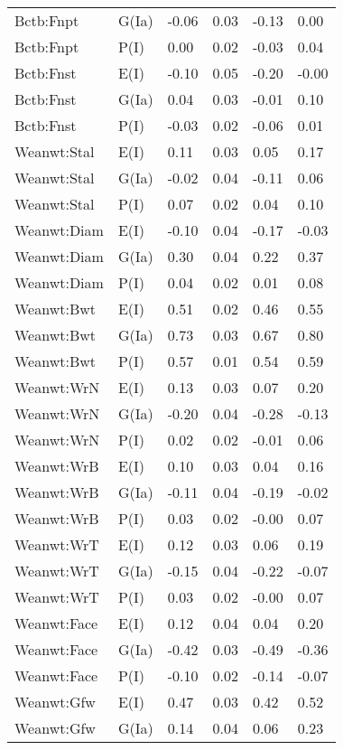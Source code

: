 \begin{center}
\begin{longtable}{|p{1.1in}|p{0.7in}|p{0.7in}|p{0.6in}|p{0.6in}|p{0.6in}|}
  Bctb:Fnpt & G(Ia) & -0.06 & 0.03 & -0.13 & 0.00 \\ 
  Bctb:Fnpt & P(I) & 0.00 & 0.02 & -0.03 & 0.04 \\ 
  Bctb:Fnst & E(I) & -0.10 & 0.05 & -0.20 & -0.00 \\ 
  Bctb:Fnst & G(Ia) & 0.04 & 0.03 & -0.01 & 0.10 \\ 
  Bctb:Fnst & P(I) & -0.03 & 0.02 & -0.06 & 0.01 \\ 
  Weanwt:Stal & E(I) & 0.11 & 0.03 & 0.05 & 0.17 \\ 
  Weanwt:Stal & G(Ia) & -0.02 & 0.04 & -0.11 & 0.06 \\ 
  Weanwt:Stal & P(I) & 0.07 & 0.02 & 0.04 & 0.10 \\ 
  Weanwt:Diam & E(I) & -0.10 & 0.04 & -0.17 & -0.03 \\ 
  Weanwt:Diam & G(Ia) & 0.30 & 0.04 & 0.22 & 0.37 \\ 
  Weanwt:Diam & P(I) & 0.04 & 0.02 & 0.01 & 0.08 \\ 
  Weanwt:Bwt & E(I) & 0.51 & 0.02 & 0.46 & 0.55 \\ 
  Weanwt:Bwt & G(Ia) & 0.73 & 0.03 & 0.67 & 0.80 \\ 
  Weanwt:Bwt & P(I) & 0.57 & 0.01 & 0.54 & 0.59 \\ 
  Weanwt:WrN & E(I) & 0.13 & 0.03 & 0.07 & 0.20 \\ 
  Weanwt:WrN & G(Ia) & -0.20 & 0.04 & -0.28 & -0.13 \\ 
  Weanwt:WrN & P(I) & 0.02 & 0.02 & -0.01 & 0.06 \\ 
  Weanwt:WrB & E(I) & 0.10 & 0.03 & 0.04 & 0.16 \\ 
  Weanwt:WrB & G(Ia) & -0.11 & 0.04 & -0.19 & -0.02 \\ 
  Weanwt:WrB & P(I) & 0.03 & 0.02 & -0.00 & 0.07 \\ 
  Weanwt:WrT & E(I) & 0.12 & 0.03 & 0.06 & 0.19 \\ 
  Weanwt:WrT & G(Ia) & -0.15 & 0.04 & -0.22 & -0.07 \\ 
  Weanwt:WrT & P(I) & 0.03 & 0.02 & -0.00 & 0.07 \\ 
  Weanwt:Face & E(I) & 0.12 & 0.04 & 0.04 & 0.20 \\ 
  Weanwt:Face & G(Ia) & -0.42 & 0.03 & -0.49 & -0.36 \\ 
  Weanwt:Face & P(I) & -0.10 & 0.02 & -0.14 & -0.07 \\ 
  Weanwt:Gfw & E(I) & 0.47 & 0.03 & 0.42 & 0.52 \\ 
  Weanwt:Gfw & G(Ia) & 0.14 & 0.04 & 0.06 & 0.23 \\ 

\end{longtable}
\end{center}
